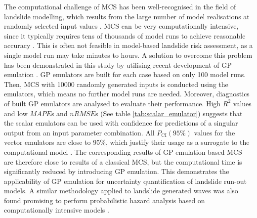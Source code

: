 \documentclass[utf8]{FrontiersinHarvard}
\begin{document}
The computational challenge of MCS has been well-recognised in the field of landslide modelling, which results from the large number of model realisations at randomly selected input values \citep{Dalbey2008, McDougall2017}. MCS can be very computationally intensive, since it typically requires tens of thousands of model runs to achieve reasonable accuracy \citep{Salciarini2017}. This is often not feasible in model-based landslide risk assessment, as a single model run may take minutes to hours. A solution to overcome this problem has been demonstrated in this study by utilising recent development of GP emulation \citep{Gu2016, Gu2018, Gu2019}. GP emulators are built for each case based on only 100 model runs. Then, MCS with 10000 randomly generated inputs is conducted using the emulators, which means no further model runs are needed. Moreover, diagnostics of built GP emulators are analysed to evaluate their performance. High $R^2$ values and low $MAPE$s and $nRMSE$s (See table \ref{tab:scalar_emulator}) suggests that the scalar emulators can be used with confidence for predictions of a singular output from an input parameter combination. All $P_\text{CI}(95\%)$ values for the vector emulators are close to 95\%, which justify their usage as a surrogate to the computational model \citep{Gu2019}. The corresponding results of GP emulation-based MCS are therefore close to results of a classical MCS, but the computational time is significantly reduced by introducing GP emulation. This demonstrates the applicability of GP emulation for uncertainty quantification of landslide run-out models. A similar methodology applied to landslide generated waves was also found promising to perform probabilistic hazard analysis based on computationally intensive models \citep{Snelling2020}.
\end{document}

